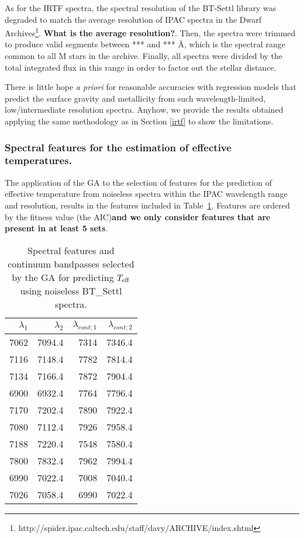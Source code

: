 
As for the IRTF spectra, the spectral resolution of the BT-Settl
library was degraded to match the average resolution of IPAC spectra
in the Dwarf
Archives\footnote{http://spider.ipac.caltech.edu/staff/davy/ARCHIVE/index.shtml}. {\bf
What is the average resolution?}. Then, the spectra were trimmed to
produce valid segments between *** and *** {\AA}, which is the
spectral range common to all M stars in the archive. Finally, all
spectra were divided by the total integrated flux in this range in
order to factor out the stellar distance.

There is little hope {\it a priori} for reasonable accuracies with
regression models that predict the surface gravity and metallicity
from such wavelength-limited, low/intermediate resolution
spectra. Anyhow, we provide the results obtained applying the same
methodology as in Section \ref{irtf} to show the limitations.

\subsubsection{Spectral features for the estimation of effective temperatures.}

The application of the GA to the selection of features for the
prediction of effective temperature from noiseless spectra within the
IPAC wavelength range and resolution, results in the features included
in Table~\ref{tab:tab_NC_T}. Features are ordered by the fitness value
(the AIC){\bf and we only consider features that are present in at least 5
sets}.

\begin{table}
\begin{center}
\begin{tabular}{rrrr}
  \hline
  $\lambda_1$ & $\lambda_2$ & $\lambda_{cont;1}$ & $\lambda_{cont;2} $ \\ 
  \hline 
  
7062 & 7094.4 &	7314 & 7346.4 \\
7116 & 7148.4 &	7782 & 7814.4 \\
7134 & 7166.4 &	7872 & 7904.4 \\
6900 & 6932.4 &	7764 & 7796.4 \\
7170 & 7202.4 &	7890 & 7922.4 \\
7080 & 7112.4 &	7926 & 7958.4 \\
7188 & 7220.4 &	7548 & 7580.4 \\
7800 & 7832.4 &	7962 & 7994.4 \\
6990 & 7022.4 &	7008 & 7040.4 \\
7026 & 7058.4 &	6990 & 7022.4 \\

\hline
\end{tabular}
\caption {Spectral features and continuum bandpasses selected by the GA for
predicting $T_{\rm eff}$ using noiseless BT\_Settl
spectra.} \label{tab:tab_NC_T}
\end{center}
\end{table}

